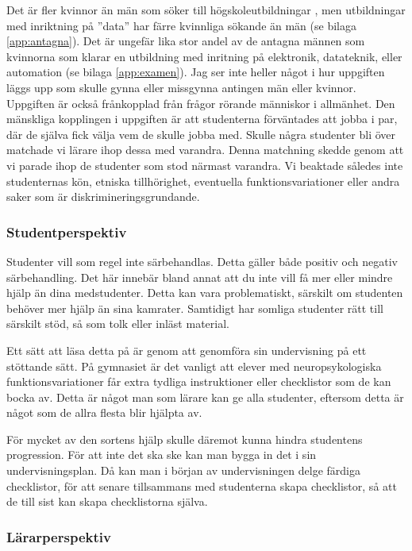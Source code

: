 \documentclass[a4paper, 10pt]{article}
\begin{document}
Det är fler kvinnor än män som söker till 
högskoleutbildningar \parencite{uhrsokande2025},
men utbildningar med inriktning på ''data'' har 
färre kvinnliga sökande än män (se bilaga 
\ref{app:antagna}). Det är ungefär lika stor 
andel av de antagna männen som kvinnorna 
som klarar en utbildning med inritning på 
elektronik, datateknik, eller automation 
(se bilaga \ref{app:examen}). Jag ser inte heller 
något i hur uppgiften läggs upp som skulle 
gynna eller missgynna antingen män eller kvinnor. 
Uppgiften är också frånkopplad från frågor rörande 
människor i allmänhet. Den mänskliga kopplingen 
i uppgiften är att studenterna förväntades att 
jobba i par, där de själva fick välja vem de 
skulle jobba med. Skulle några studenter bli 
över matchade vi lärare ihop dessa med varandra. 
Denna matchning skedde genom att vi parade ihop 
de studenter som stod närmast varandra. Vi 
beaktade således inte studenternas kön, 
etniska tillhörighet, eventuella 
funktionsvariationer eller andra saker som är 
diskrimineringsgrundande.

\subsubsection{Studentperspektiv}

Studenter vill som regel inte särbehandlas. 
Detta gäller både positiv och negativ 
särbehandling. Det här innebär bland annat att 
du inte vill få mer eller mindre hjälp än dina 
medstudenter. Detta kan vara problematiskt, 
särskilt om studenten behöver mer hjälp än sina 
kamrater. Samtidigt har somliga studenter rätt 
till särskilt stöd, så som tolk eller inläst 
material.

Ett sätt att läsa detta på är genom att 
genomföra sin undervisning på ett stöttande sätt. 
På gymnasiet är det vanligt att elever med 
neuropsykologiska funktionsvariationer får extra 
tydliga instruktioner eller checklistor som 
de kan bocka av. Detta är något man som lärare 
kan ge alla studenter, eftersom detta är något 
som de allra flesta blir hjälpta av.

För mycket av den sortens hjälp skulle däremot 
kunna hindra studentens progression. För att 
inte det ska ske kan man bygga in det i sin 
undervisningsplan. Då kan man i början av 
undervisningen delge färdiga checklistor, för 
att senare tillsammans med studenterna skapa 
checklistor, så att de till sist kan skapa 
checklistorna själva.

\subsubsection{Lärarperspektiv}
\end{document}

